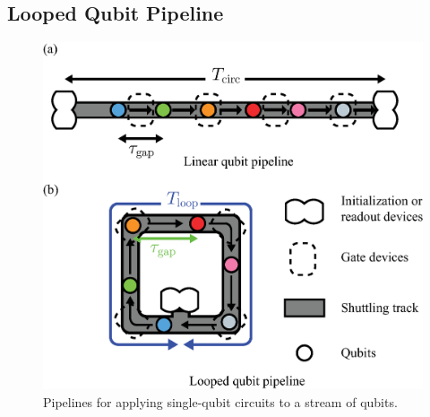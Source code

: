 \documentclass[a4paper,11pt]{ltjsarticle}
\begin{document}
{    \subsection{Looped Qubit Pipeline}{
        \begin{figure}[h]
            \centering
            \includegraphics[scale=0.50]{figure/shuttling_track.eps}
            \vspace{0pt}\caption{Pipelines for applying single-qubit circuits to a stream of qubits.}
            \label{shuttling_truck}
        \end{figure}

}}
\end{document}
